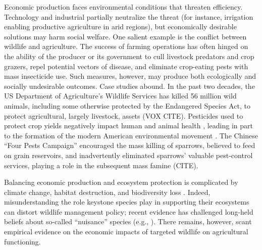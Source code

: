 

Economic production faces environmental conditions that threaten efficiency. Technology and industrial partially neutralize the threat (for instance, irrigation enabling productive agriculture in arid regions), but economically desirable solutions may harm social welfare. One salient example is the conflict between wildlife and agriculture. The success of farming operations has often hinged on the ability of the producer or its government to cull livestock predators and crop grazers, repel potential vectors of disease, and eliminate crop-eating pests with mass insecticide use. Such measures, however, may produce both ecologically and socially undesirable outcomes. Case studies abound. In the past two decades, the US Department of Agriculture's Wildlife Services has killed 56 million wild animals, including some otherwise protected by the Endangered Species Act, to protect agricultural, largely livestock, assets (VOX CITE). Pesticides used to protect crop yields negatively impact human and animal health \citep{larsen_agricultural_2017}, leading in part to the formation of the modern American environmental movement \citep{woodwell_broken_1984}. The Chinese ``Four Pests Campaign'' encouraged the mass killing of sparrows, believed to feed on grain reservoirs, and inadvertently eliminated sparrows' valuable pest-control services, playing a role in the subsequent mass famine (CITE). 

Balancing economic production and ecosystem protection is complicated by climate change, habitat destruction, and biodiversity loss \citep{cardinale_biodiversity_2012}. Indeed, misunderstanding the role keystone species play in supporting their ecosystems can distort wildlife management policy; recent evidence has challenged long-held beliefs about so-called ``nuisance'' species (e.g., \cite{raynor_wolves_2021}). There remains, however, scant empirical evidence on the economic impacts of targeted wildlife on agricultural functioning.

